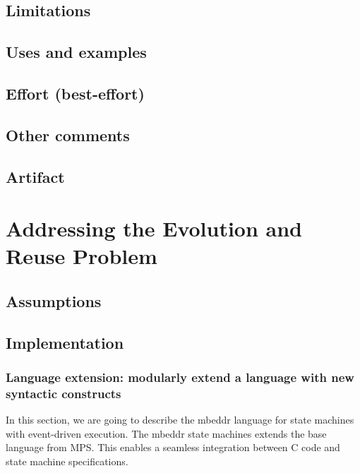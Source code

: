 \documentclass[preprint,numbers,10pt]{sigplanconf}
\begin{document}
\subsection{Limitations}

\subsection{Uses and examples}

\subsection{Effort (best-effort)}

\subsection{Other comments}

\subsection{Artifact}

%
%

\section{Addressing the Evolution and Reuse Problem}

\subsection{Assumptions}

\subsection{Implementation}

\subsubsection{Language extension: modularly extend a language with new syntactic constructs}

In this section, we are going to describe the mbeddr language for state
machines with event-driven execution. The mbeddr state machines extends
the base language from MPS. This enables a seamless integration between
C code and state machine specifications.
\end{document}
